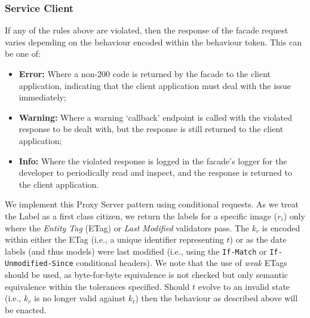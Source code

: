 

\subsubsection{Service Client}

If any of the rules above are violated, then the response of the facade request varies depending on the behaviour encoded within the behaviour token. This can be one of:

\begin{itemize}
    \item \textbf{Error:} Where a  non-200 code is returned by the facade to the client application, indicating that the client application must deal with the issue immediately;
    \item \textbf{Warning:} Where a warning `callback' endpoint is called with the violated response to be dealt with, but the response is still returned to the client application;
    \item \textbf{Info:} Where the violated response is logged in the facade's logger for the developer to periodically read and inspect, and the response is returned to the client application.
\end{itemize}

We implement this Proxy Server pattern using  conditional requests. As we treat the Label as a first class citizen, we return the labels for a specific image ($r_{i}$) only where the \textit{Entity Tag} (ETag) or \textit{Last Modified} validators pass. The $k_{r}$ is encoded within either the ETag (i.e., a unique identifier representing $t$) or as the date labels (and thus models) were last modified (i.e., using the \texttt{If-Match} or \texttt{If-Unmodified-Since} conditional headers). We note that the use of \textit{weak} ETags should be used, as byte-for-byte equivalence is not checked but only semantic equivalence within the tolerances specified. Should $t$ evolve to an invalid state (i.e., $k_{r}$ is no longer valid against $k_{t}$) then the behaviour as described above will be enacted.


